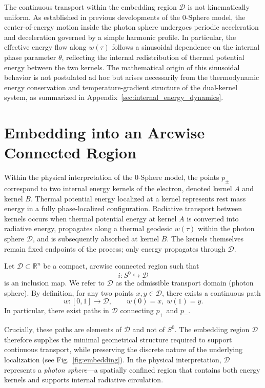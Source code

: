 \documentclass[%
 reprint,
 amsmath,amssymb,
 aps,
 prb,
]{revtex4-2}
\numberwithin{equation}{section}
\begin{document}
The continuous transport within the embedding region $\mathcal{D}$ is not kinematically uniform.
As established in previous developments of the 0-Sphere model, the center-of-energy motion inside the photon sphere undergoes periodic acceleration and deceleration governed by a simple harmonic profile.
In particular, the effective energy flow along $w(\tau)$ follows a sinusoidal dependence on the internal phase parameter $\theta$, reflecting the internal redistribution of thermal potential energy between the two kernels.
The mathematical origin of this sinusoidal behavior is not postulated ad hoc but arises necessarily from the thermodynamic energy conservation and temperature-gradient structure of the dual-kernel system, as summarized in Appendix~\ref{sec:internal_energy_dynamics}.


\section{Embedding into an Arcwise Connected Region}
\label{sec:embedding}

Within the physical interpretation of the 0-Sphere model, the points $p_{\pm}$ correspond to two internal energy kernels of the electron, denoted kernel $A$ and kernel $B$.
Thermal potential energy localized at a kernel represents rest mass energy in a fully phase-localized configuration.
Radiative transport between kernels occurs when thermal potential energy at kernel $A$ is converted into radiative energy, propagates along a thermal geodesic $w(\tau)$ within the photon sphere $\mathcal{D}$, and is subsequently absorbed at kernel $B$.
The kernels themselves remain fixed endpoints of the process; only energy propagates through $\mathcal{D}$.

Let $\mathcal{D} \subset \mathbb{R}^{n}$ be a compact, arcwise connected region \cite{Munkres2000} such that
\begin{equation}
i : S^{0} \hookrightarrow \mathcal{D}
\end{equation}
is an inclusion map. We refer to $\mathcal{D}$ as the admissible transport domain (photon sphere). By definition, for any two points $x,y \in \mathcal{D}$, there exists a continuous path
\begin{equation}
w : [0,1] \rightarrow \mathcal{D}, \qquad w(0)=x,\; w(1)=y .
\end{equation}
In particular, there exist paths in $\mathcal{D}$ connecting $p_{+}$ and $p_{-}$.

Crucially, these paths are elements of $\mathcal{D}$ and not of $S^{0}$.
The embedding region $\mathcal{D}$ therefore supplies the minimal geometrical structure required to support continuous transport, while preserving the discrete nature of the underlying localization (see Fig.~\ref{fig:embedding}).
In the physical interpretation, $\mathcal{D}$ represents a \textit{photon sphere}—a spatially confined region that contains both energy kernels and supports internal radiative circulation.
\end{document}
